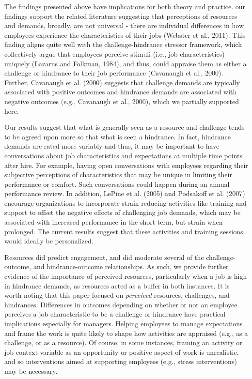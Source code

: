 \documentclass[
  man]{apa7}
\begin{document}
The findings presented above have implications for both theory and practice. our findings support the related literature suggesting that perceptions of resources and demands, broadly, are not universal - there are individual differences in how employees experience the characteristics of their jobs (Webster et al., 2011). This finding aligns quite well with the challenge-hindrance stressor framework, which collectively argue that employees perceive stimuli (i.e., job characteristics) uniquely (Lazarus and Folkman, 1984), and thus, could appraise them as either a challenge or hindrance to their job performance (Cavanaugh et al., 2000). Further, Cavanaugh et al. (2000) suggests that challenge demands are typically associated with positive outcomes and hindrance demands are associated with negative outcomes (e.g., Cavanaugh et al., 2000), which we partially supported here.

Our results suggest that what is generally seen as a resource and challenge tends to be agreed upon more so that what is seen a hindrance. In fact, hindrance demands are rated more variably and thus, it may be important to have conversations about job characteristics and expectations at multiple time points after hire. For example, having open conversations with employees regarding their subjective perceptions of characteristics that may be unique in limiting their performance or comfort. Such conversations could happen during an annual performance review. In addition, LePine et al. (2005) and Podsakoff et al. (2007) encourage organizations to incorporate strain-reducing activities like training and support to offset the negative effects of challenging job demands, which may be associated with increased performance in the short term, but strain when prolonged. The current results suggest that these activities and training sessions would ideally be personalized.

Resources did predict engagement, and did moderate several of the challenge-outcome, and hindrance-outcome relationships. As such, we provide further evidence of the importance of perceived resources, particularly when a job is high in hindrance demands, as resources acted as a buffer in both instances. It is worth noting that this paper focused on \emph{perceived} resources, challenges, and hindrances. Differences in outcomes depending on whether or not an employee perceives a job characteristic to be a challenge or hindrance have practical implications especially for managers. Helping employees to manage expectations and frame the work is quite likely to shape how activities are appraised (e.g., as a challenge, or as a resource). Of course, in some instances, framing an activity or job context variable as an opportunity or positive aspect of work is unrealistic, and so interventions aimed at supporting employees (e.g., stress interventions) may be necessary.
\end{document}
